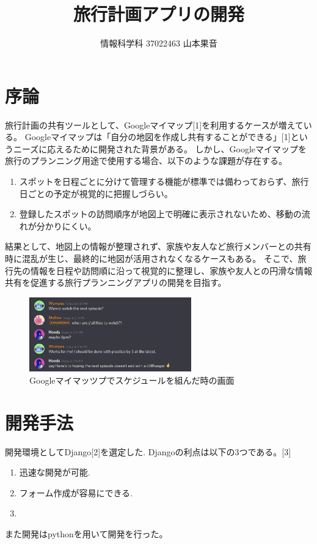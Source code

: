 \documentclass[a4j,twocolumn]{jsarticle}
\begin{document}
  \title{旅行計画アプリの開発}
  \author{情報科学科 \hspace{5mm} 37022463 \hspace{5mm} 山本果音}
  \date{}

  \maketitle


\section{序論}
\label{sec:orgf311ea3}
旅行計画の共有ツールとして、Googleマイマップ[1]を利用するケースが増えている。
Googleマイマップは「自分の地図を作成し共有することができる」[1]というニーズに応えるために開発された背景がある。
しかし、Googleマイマップを旅行のプランニング用途で使用する場合、以下のような課題が存在する。
\begin{enumerate}
\item スポットを日程ごとに分けて管理する機能が標準では備わっておらず、旅行日ごとの予定が視覚的に把握しづらい。
\item 登録したスポットの訪問順序が地図上で明確に表示されないため、移動の流れが分かりにくい。
\end{enumerate}
結果として、地図上の情報が整理されず、家族や友人など旅行メンバーとの共有時に混乱が生じ、最終的に地図が活用されなくなるケースもある。
そこで、旅行先の情報を日程や訪問順に沿って視覚的に整理し、家族や友人との円滑な情報共有を促進する旅行プランニングアプリの開発を目指す。



\begin{figure}[htbp]
\centering
\includegraphics[width=7cm]{./figs/discord.jpg}
\caption{\label{fig:org7383e91}Googleマイマッツプでスケジュールを組んだ時の画面}
\end{figure}


\section{開発手法}
\label{sec:org7c340fd}
開発環境としてDjango[2]を選定した.
Djangoの利点は以下の3つである。[3]
\begin{enumerate}
\item 迅速な開発が可能.
\item フォーム作成が容易にできる.
\item 
\end{enumerate}
また開発はpythonを用いて開発を行った。
\end{document}
